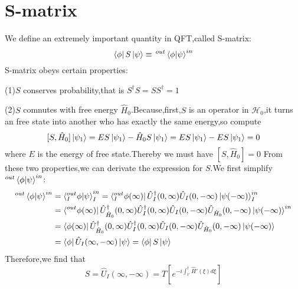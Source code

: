 \documentclass[a4paper]{article}
\begin{document}
\section{S-matrix}
We define an extremely important quantity in QFT,called S-matrix:$$\bra{\phi}S\ket{\psi}\equiv\, ^{out}\braket{\phi|\psi}^{in}$$
S-matrix obeys certain properties:
\par (1)$S$ conserves probability,that is $S^{\dagger}S=SS^{\dagger}=1$
\par (2)$S$ comnutes with free energy $\hat{H}_0$.Because,first,$S$ is an operator in $\mathscr{H}_0$,it turns an free state into another who has exactly the same energy,so compute$$[S,\hat{H}_0]\ket{\psi_1}=ES\ket{\psi_1}-\hat{H}_0S\ket{\psi_1}=ES\ket{\psi_1}-ES\ket{\psi_1}=0$$where $E$ is the energy of free state.Thereby we must have $[S,\hat{H}_0]=0$
From these two properties,we can derivate the expression for $S$.We first simplify $ ^{out}\braket{\phi|\psi}^{in}$:
\begin{align*}
	^{out}\braket{\phi|\psi}^{in}&=\braket{^{out}_I\phi|\psi}^{in}_I=\bra{^{out}_I\phi(\infty)}\hat{U}^{\dagger}_I(0,\infty)\hat{U}_I(0,-\infty)\ket{\psi(-\infty)}^{in}_I\\&=\bra{^{out}\phi(\infty)}\hat{U}^{\dagger}_{\hat{H}_0}(0,\infty)\hat{U}^{\dagger}_I(0,\infty)\hat{U}_I(0,-\infty)\hat{U}_{\hat{H}_0}(0,-\infty)\ket{\psi(-\infty)}^{in}\\&=\bra{\phi(\infty)}\hat{U}^{\dagger}_{\hat{H}_0}(0,\infty)\hat{U}^{\dagger}_I(0,\infty)\hat{U}_I(0,-\infty)\hat{U}_{\hat{H}_0}(0,-\infty)\ket{\psi(-\infty)}\\&=\bra{\phi}\hat{U}_I(\infty,-\infty)\ket{\psi}=\bra{\phi}S\ket{\psi}
\end{align*}
Therefore,we find that$$S=\hat{U}_I(\infty,-\infty)=T[e^{-i\int_{t'}^{t}\hat{H}'(\xi)d\xi}]$$
\end{document}
